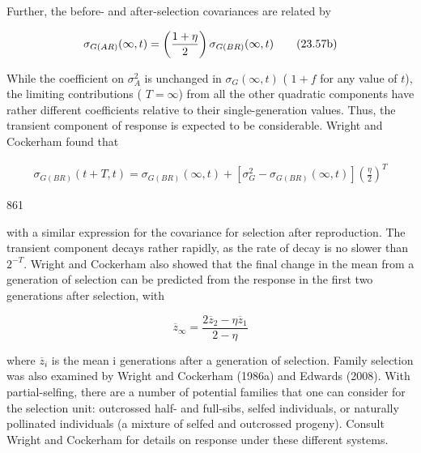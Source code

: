 \documentclass{article}
\begin{document}
Further, the before- and after-selection covariances are related by

\begin{equation}
\begin{align*}\sigma_{G(AR)}(\infty,t)=\left({1+\eta\over2}\right)\sigma_{G(BR)}(\infty,t)\end{align*}
\tag{23.57b}
\label{eq:23_57b}
\end{equation}

While the coefficient on  $ \sigma_A^2 $ is unchanged in  $ \sigma_G(\infty, t) $ ( $ 1 + f $ for any value of  $ t $), the limiting contributions ( $ T = \infty $) from all the other quadratic components have rather different coefficients relative to their single-generation values. Thus, the transient component of response is expected to be considerable. Wright and Cockerham found that

\begin{equation}
\begin{align*}\sigma_{G(BR)}(t+T,t)=\sigma_{G(BR)}(\infty,t)+\left[\sigma_G^2-\sigma_{G(BR)}(\infty,t)\right]\left(\frac{\eta}{2}\right)^T\end{align*}
\tag{23.58}
\label{eq:23_58}
\end{equation}

861

with a similar expression for the covariance for selection after reproduction. The transient component decays rather rapidly, as the rate of decay is no slower than  $ 2^{-T} $. Wright and Cockerham also showed that the final change in the mean from a generation of selection can be predicted from the response in the first two generations after selection, with

\begin{equation}
\overline{z}_{\infty}=\frac{2\overline{z}_{2}-\eta\overline{z}_{1}}{2-\eta}
\tag{23.59}
\label{eq:23_59}
\end{equation}

where  $ \overline{z}_{i} $ is the mean i generations after a generation of selection. Family selection was also examined by Wright and Cockerham (1986a) and Edwards (2008). With partial-selfing, there are a number of potential families that one can consider for the selection unit: outcrossed half- and full-sibs, selfed individuals, or naturally pollinated individuals (a mixture of selfed and outcrossed progeny). Consult Wright and Cockerham for details on response under these different systems.
\end{document}
